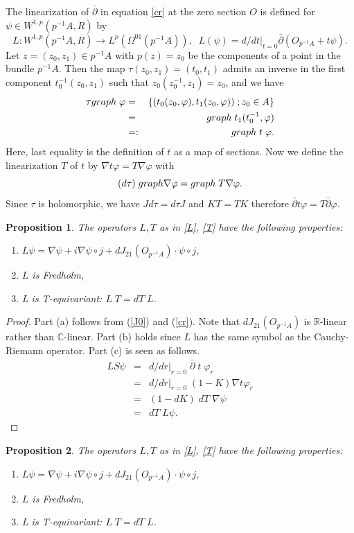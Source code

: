\documentclass[10pt,a4paper]{amsart}
\newtheorem{proposition}{Proposition}
\newcommand{\be}{\begin{equation}}
\newcommand{\bean}{\begin{eqnarray*}}
\newcommand{\ee}{\end{equation}}
\newcommand{\eean}{\end{eqnarray*}}
\begin{document}
The linearization of  $\overline \partial$ in equation \eqref{cr} at the zero section $O$ is defined for  $\psi \in W^{1,p}(p^{-1}A,R)$ by
\be \label{L}
L:W^{1,p}(p^{-1}A,R)\to L^p(\Omega^{01}(p^{-1}A)), \;\;
L(\psi)=d/dt|_{t=0} \bar{\partial}(O_{p^{-1}A} + t\psi). 
\ee
Let $z=(z_0, z_1) \in p^{-1}A$ with $p(z) = z_0$ be the components of a point in the bundle $p^{-1}A$. Then the map
$\tau (z_0, z_1)=(t_0, t_1)$ admits an inverse in the first component $t_0^{-1}(z_0, z_1)$ such that  
$z_0(z_0^{-1}, z_1)=z_0$, and we have 
\bean
 \tau {\rm graph}\; \varphi 
&=& \{ (t_0(z_0, \varphi), t_1(z_0, \varphi))  \; ; z_0 \in A \} \\
&=& {\rm graph}\; t_1 (t_0^{-1},\varphi )\\
&=:& {\rm  graph} \; t \;\varphi.
\eean
Here, last equality is the definition of $t$ as a map of sections.
Now we define the linearization $T$  of $t$ by $\nabla t \varphi=T \nabla \varphi$ with
\be \label{T}
(d  \tau)\; {\rm graph}\nabla \varphi={\rm graph}\; T \nabla \varphi.
\ee
Since $\tau$ is holomorphic, we have $J d \tau=d \tau J $  and $K T= T K$ therefore $\bar{\partial} t\varphi=T \bar{\partial}\varphi$.
\\
\begin{proposition} \label{p:lin}
The operators $L, T$ as in \eqref{L}, \eqref{T} have the following properties:
\begin{enumerate}\item[(a)] $L\psi=\nabla\psi+i
\nabla\psi\circ j + dJ_{21}(O_{p^{-1}A})\cdot \psi \circ j$,
\item[(b)] $L$ is Fredholm,
\item[(c)] L is T-equivariant: $ L\; T =dT\; L$. \end{enumerate} 
\end{proposition}
\begin{proof}
    Part (a) follows from (\ref{J0}) and (\ref{cr}). Note that $dJ_{21}(O_{p^{-1}A})$ is ${\mathbb{R}}$-linear rather than ${\mathbb{C}}$-linear. Part (b) holds since $L$ has the same symbol as the Cauchy-Riemann operator. Part (c) is seen as follows. 
\bean 
L S \psi &=&  d/dr|_{r=0} \;\bar{\partial}\; t \;\varphi_r \\
&=&  d/dr|_{r=0} \; (1-K) \nabla t \varphi_r \\
&=&  (1-d K) \; d T  \;\nabla \psi \\
&=&  d T\; L \psi.
\eean
\end{proof}

\begin{proposition} 
The operators $L, T$ as in \eqref{L}, \eqref{T} have the following properties:
\begin{enumerate}\item[(a)] $L\psi=\nabla\psi+i
\nabla\psi\circ j + dJ_{21}(O_{p^{-1}A})\cdot \psi \circ j$,
\item[(b)] $L$ is Fredholm,
\item[(c)] L is T-equivariant: $ L\; T =dT\; L$. \end{enumerate} 
\end{proposition}
\end{document}
